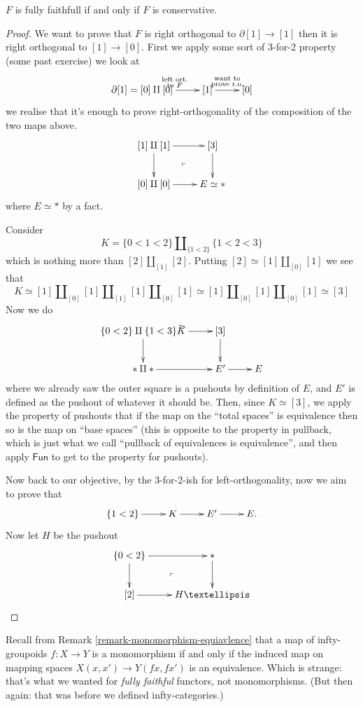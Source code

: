 \begin{theorem}
\label{theorem-fully-faith-impli-conse}
$F$ is fully faithfull if and only if
$F$ is conservative.
\end{theorem}

\begin{proof}
We want to prove that $F$
is right orthogonal to $\partial[1]\to [1]$
then it is right orthogonal to $[1]\to [0]$.
First we apply some sort of 3-for-2
property (some past exercise)
we look at
$$
\xymatrix{
\partial[1]=[0]\amalg[0]\ar[r]
^{\substack{\text{left
ort.} \\ \text{to $F$}}}
& [1]\ar[r]^{\substack{\text{want to} \\
\text{prove r.o.}}}
&[0]
}
$$
we realise that it's enough
to prove right-orthogonality of the
composition of the two maps above.
$$
\xymatrix{
[1]\amalg[1]\ar[r]\ar[d]\ar@{}[dr]|-
{\ulcorner}&[3]\ar[d]\\
[0]\amalg[0]\ar[r]&E\simeq \ast
}
$$
where $E \simeq *$ by a fact.

Consider
$$
K=\{0<1<2\}\amalg_{\{1<2\}}\{1<2<3\}
$$
which is nothing more than
$[2]\amalg_{[1]}[2]$.
Putting $[2]\simeq[1]\amalg_{[0]}[1]$
we see that
$$
K\simeq[1]\amalg_{[0]}[1]\amalg_{[1]}[1]
\amalg_{[0]}[1]
\simeq[1]\amalg_{[0]}[1]\amalg_{[0]}[1]
\simeq[3]
$$
Now we do
$$
\xymatrix{
\{0<2\}\amalg\{1<3\}K\ar[r]^{\simeq}\ar[d]&
[3]\ar[d]\\
\ast \amalg \ast\ar[r]&E' \ar[r]&E
}
$$
where we already saw the outer square is
a pushouts by definition of $E$,
and $E'$ is defined as the pushout of
whatever it should be.
Then, since $K \simeq [3]$,
we apply the property of pushouts
that if the map on the ``total spaces''
is equivalence then so is the
map on ``base spaces''
(this is opposite to the property in
pullback,
which is just what we call
``pullback of equivalences is equivalence'',
and then apply $\mathsf{Fun}$
to get to the property for pushouts).

Now back to our objective,
by the 3-for-2-ish for left-orthogonality,
now we aim to prove that
$$
\xymatrix{
\{1<2\}\ar[r]& K\ar[r]&E'\ar[r]&E.
}
$$
Now let $H$ be the pushout
$$
\xymatrix{
\{0<2\} \ar[r]\ar[d]\ar@{}[dr]|-{\ulcorner}&
\ast \ar[d]\\
[2] \ar[r]& H…
}
$$
\end{proof}

Recall from Remark
\ref{remark-monomorphism-equiavlence}
that a map of infty-groupoids $f:X \to Y$
is a monomorphism if and only if
the induced map on mapping spaces
$X(x,x') \to Y(fx,fx')$ is an equivalence.
Which is strange: that's what we wanted for
{\it fully faithful} functors, not
monomorphisms.
(But then again: that was before we defined
infty-categories.)

